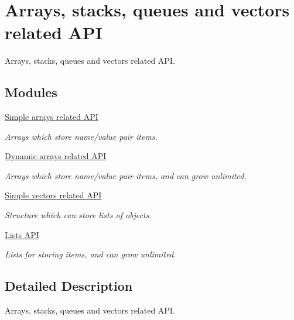 \hypertarget{group__ARRAYS}{
\section{Arrays, stacks, queues and vectors related API}
\label{group__ARRAYS}
}


Arrays, stacks, queues and vectors related API.  
\subsection*{Modules}
\begin{DoxyCompactItemize}
\item 
\hyperlink{group__SIMPLE__ARRAYS}{Simple arrays related API}


\begin{DoxyCompactList}\small\item\em Arrays which store name/value pair items. \item\end{DoxyCompactList}\item 
\hyperlink{group__DYNAMIC__ARRAYS}{Dynamic arrays related API}


\begin{DoxyCompactList}\small\item\em Arrays which store name/value pair items, and can grow unlimited. \item\end{DoxyCompactList}\item 
\hyperlink{group__VECTORS}{Simple vectors related API}


\begin{DoxyCompactList}\small\item\em Structure which can store lists of objects. \item\end{DoxyCompactList}\item 
\hyperlink{group__LISTS}{Lists API}


\begin{DoxyCompactList}\small\item\em Lists for storing items, and can grow unlimited. \item\end{DoxyCompactList}\end{DoxyCompactItemize}


\subsection{Detailed Description}
Arrays, stacks, queues and vectors related API. 